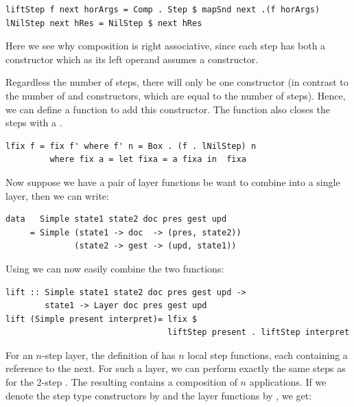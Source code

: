 \documentclass{llncs}
\begin{document}
\begin{small} %
\begin{verbatim}
liftStep f next horArgs = Comp . Step $ mapSnd next .(f horArgs)
lNilStep next hRes = NilStep $ next hRes
\end{verbatim}%
\end{small}

Here we see why composition is right associative, since each step has both a constructor which as its left operand assumes a  constructor. 


Regardless the number of steps, there will only be one  constructor (in contrast to the number of  and  constructors, which are equal to the number of steps). Hence, we can define a function  to add this constructor. The function  also closes the steps with a . 

\begin{small}%
\begin{verbatim}
lfix f = fix f' where f' n = Box . (f . lNilStep) n
         where fix a = let fixa = a fixa in  fixa
\end{verbatim}
\end{small}

Now suppose we have a pair of layer functions be want to combine into a single layer, then we can write:
\begin{small}%
\begin{verbatim}
data   Simple state1 state2 doc pres gest upd 
     = Simple (state1 -> doc  -> (pres, state2))
              (state2 -> gest -> (upd, state1))
\end{verbatim}
\end{small}

Using  we can now easily combine the two functions:

\begin{small} %
\begin{verbatim}
lift :: Simple state1 state2 doc pres gest upd ->
        state1 -> Layer doc pres gest upd
lift (Simple present interpret)= lfix $ 
                                 liftStep present . liftStep interpret
\end{verbatim}%
\end{small}

\bc
For an $n$-step layer, the definition of  has $n$ local step functions, each  containing a reference to the next. \bc {} \ec For such a layer, we can perform exactly the same steps as for the 2-step . The resulting  contains a composition of $n$  applications. If we denote the step type constructors by  and the layer functions by , we get:
\end{document}

